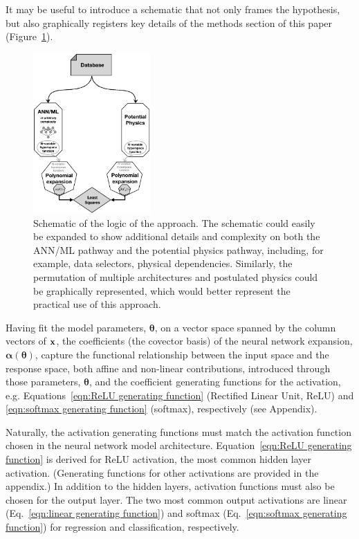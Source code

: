 It may be useful to introduce a schematic that not only frames the hypothesis, but also graphically registers key details of the methods section of this paper (Figure~\ref{fig:nn-2}).


\begin{figure}[htbp]
\begin{center}
\includegraphics[width=0.4\textwidth]{fig/Schematic-02}
\caption{Schematic of the logic of the approach. The schematic could easily be expanded to show additional details and complexity on both the ANN/ML pathway and the potential physics pathway, including, for example, data selectors, physical dependencies. Similarly, the permutation of multiple architectures and postulated physics could be graphically represented, which would better represent the practical use of this approach.}
\label{fig:nn-2}
\end{center}
\end{figure}


Having fit the model parameters, $\boldsymbol{\theta}$, on a vector space spanned by the column vectors of ${\bf x}$, the coefficients (the covector basis) of the neural network expansion, $\boldsymbol{\alpha}(\boldsymbol{\theta})$, capture the functional relationship between the input space and the response space, both affine and non-linear contributions, introduced through those parameters, $\boldsymbol{\theta}$, and the coefficient generating functions for the activation, e.g. Equations~\ref{eqn:ReLU generating function} (Rectified Linear Unit, ReLU) and \ref{eqn:softmax generating function} (softmax), respectively (see Appendix).

Naturally, the activation generating functions must match the activation function chosen in the neural network model architecture. Equation~\ref{eqn:ReLU generating function} is derived for ReLU activation, the most common hidden layer activation. (Generating functions for other activations are provided in the appendix.) In addition to the hidden layers, activation functions must also be chosen for the output layer. The two most common output activations are linear (Eq.~\ref{eqn:linear generating function}) and softmax (Eq.~\ref{eqn:softmax generating function}) for regression and classification, respectively.

